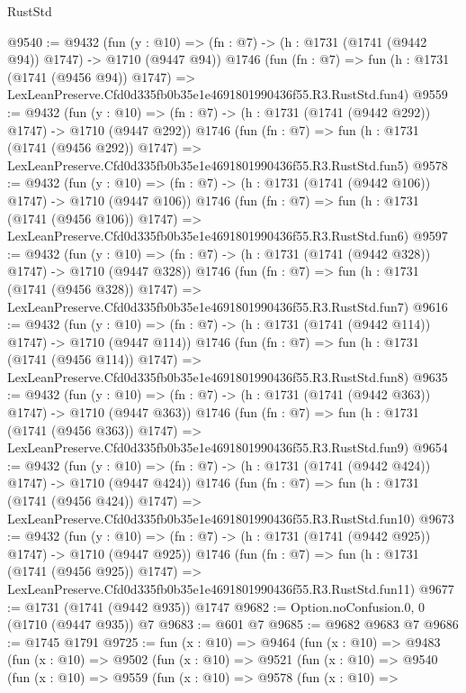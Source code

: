 \begin{lexlean}{RustStd}
\begin{coremodule}
@9540 := @9432
    (fun (y : @10) => (fn : @7) -> (h : @1731 (@1741 (@9442 @94)) @1747) -> @1710 (@9447 @94))
    @1746
    (fun (fn : @7) =>
    fun (h : @1731 (@1741 (@9456 @94)) @1747) =>
    LexLeanPreserve.Cfd0d335fb0b35e1e4691801990436f55.R3.RustStd.fun4)
@9559 := @9432
    (fun (y : @10) => (fn : @7) -> (h : @1731 (@1741 (@9442 @292)) @1747) -> @1710 (@9447 @292))
    @1746
    (fun (fn : @7) =>
    fun (h : @1731 (@1741 (@9456 @292)) @1747) =>
    LexLeanPreserve.Cfd0d335fb0b35e1e4691801990436f55.R3.RustStd.fun5)
@9578 := @9432
    (fun (y : @10) => (fn : @7) -> (h : @1731 (@1741 (@9442 @106)) @1747) -> @1710 (@9447 @106))
    @1746
    (fun (fn : @7) =>
    fun (h : @1731 (@1741 (@9456 @106)) @1747) =>
    LexLeanPreserve.Cfd0d335fb0b35e1e4691801990436f55.R3.RustStd.fun6)
@9597 := @9432
    (fun (y : @10) => (fn : @7) -> (h : @1731 (@1741 (@9442 @328)) @1747) -> @1710 (@9447 @328))
    @1746
    (fun (fn : @7) =>
    fun (h : @1731 (@1741 (@9456 @328)) @1747) =>
    LexLeanPreserve.Cfd0d335fb0b35e1e4691801990436f55.R3.RustStd.fun7)
@9616 := @9432
    (fun (y : @10) => (fn : @7) -> (h : @1731 (@1741 (@9442 @114)) @1747) -> @1710 (@9447 @114))
    @1746
    (fun (fn : @7) =>
    fun (h : @1731 (@1741 (@9456 @114)) @1747) =>
    LexLeanPreserve.Cfd0d335fb0b35e1e4691801990436f55.R3.RustStd.fun8)
@9635 := @9432
    (fun (y : @10) => (fn : @7) -> (h : @1731 (@1741 (@9442 @363)) @1747) -> @1710 (@9447 @363))
    @1746
    (fun (fn : @7) =>
    fun (h : @1731 (@1741 (@9456 @363)) @1747) =>
    LexLeanPreserve.Cfd0d335fb0b35e1e4691801990436f55.R3.RustStd.fun9)
@9654 := @9432
    (fun (y : @10) => (fn : @7) -> (h : @1731 (@1741 (@9442 @424)) @1747) -> @1710 (@9447 @424))
    @1746
    (fun (fn : @7) =>
    fun (h : @1731 (@1741 (@9456 @424)) @1747) =>
    LexLeanPreserve.Cfd0d335fb0b35e1e4691801990436f55.R3.RustStd.fun10)
@9673 := @9432
    (fun (y : @10) => (fn : @7) -> (h : @1731 (@1741 (@9442 @925)) @1747) -> @1710 (@9447 @925))
    @1746
    (fun (fn : @7) =>
    fun (h : @1731 (@1741 (@9456 @925)) @1747) =>
    LexLeanPreserve.Cfd0d335fb0b35e1e4691801990436f55.R3.RustStd.fun11)
@9677 := @1731 (@1741 (@9442 @935)) @1747
@9682 := Option.noConfusion.{0, 0} (@1710 (@9447 @935)) @7
@9683 := @601 @7
@9685 := @9682 @9683 @7
@9686 := @1745 @1791
@9725 := fun (x : @10) =>
  @9464
    (fun (x : @10) =>
    @9483
      (fun (x : @10) =>
      @9502
        (fun (x : @10) =>
        @9521
          (fun (x : @10) =>
          @9540
            (fun (x : @10) =>
            @9559
              (fun (x : @10) =>
              @9578
                (fun (x : @10) =>

\end{coremodule}
\end{lexlean}
